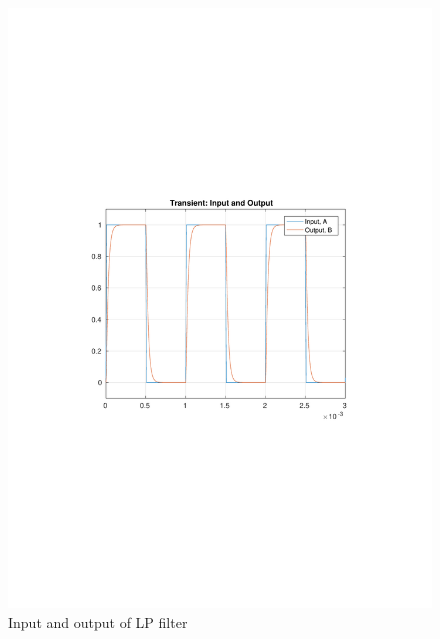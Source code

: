 \documentclass[12pt,a4paper,UKenglish]{article}
\begin{document}
\begin{figure} [htbp]
  \centering 
  \includegraphics[width=\textwidth]{img/2c_tran.pdf} 
  \caption{Input and output of LP filter}
  \label{tran_tuned} 
\end{figure}
\end{document}
